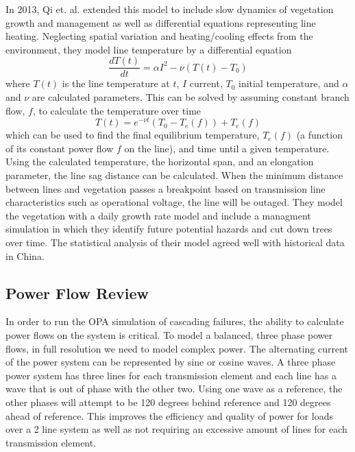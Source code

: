 In 2013, Qi et. al. extended this model to include slow dynamics of vegetation growth and management as well as differential equations representing line heating.  Neglecting spatial variation and heating/cooling effects from   the environment, they model line temperature by a differential equation
\begin{equation}
\frac{dT(t)}{dt} = \alpha I^2 - \nu (T(t) - T_0)
\end{equation}
where $T(t)$ is the line temperature at $t$, $I$ current, $T_0$ initial temperature, and $\alpha$ and $\nu$ are calculated parameters.  This can be solved by assuming constant branch flow, $f$, to calculate the temperature over time
\begin{equation}
T(t) = e^{-\nu t}\left( T_0 - T_e(f) \right) + T_e(f)
\end{equation}
which can be used to find the final equilibrium temperature, $T_e(f)$ (a function of its constant power flow $f$ on the line), and time until a given temperature.  Using the calculated temperature, the horizontal span, and an elongation parameter, the line sag distance can be calculated.  When the minimum distance between lines and vegetation passes a breakpoint based on transmission line characteristics such as operational voltage, the line will be outaged.  They model the vegetation with a daily growth rate model and include a managment simulation in which they identify future potential hazards and cut down trees over time.  The statistical analysis of their model agreed well with historical data in China.


\subsection{Power Flow Review}
In order to run the OPA simulation of cascading failures, the ability to calculate power flows on the system is critical.  To model a balanced, three phase power flows, in full resolution we need to model complex power.  The alternating current of the power system can be represented by sine or cosine waves.  A three phase power system has three lines for each transmission element and each line has a wave that is out of phase with the other two.  Using one wave as a reference, the other phases will attempt to be 120 degrees behind reference and 120 degrees ahead of reference.  This improves the efficiency and quality of power for loads over a 2 line system as well as not requiring an excessive amount of lines for each transmission element.  

